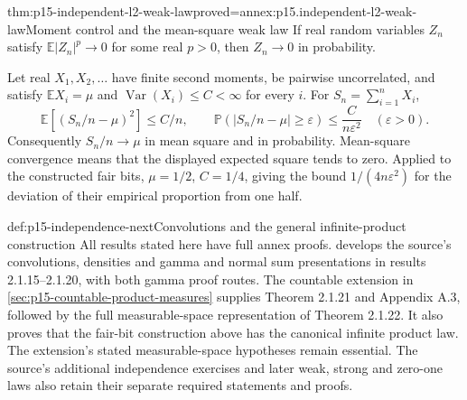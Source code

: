 \begin{hbtheorem}{thm:p15-independent-l2-weak-law}{proved=annex:p15.independent-l2-weak-law}{Moment control and the mean-square weak law}
If real random variables \(Z_n\) satisfy
\(\mathbb E|Z_n|^p\to0\) for some real \(p>0\), then
\(Z_n\to0\) in probability.

Let real \(X_1,X_2,\ldots\) have finite second moments, be
pairwise uncorrelated, and satisfy
\(\mathbb E X_i=\mu\) and \(\operatorname{Var}(X_i)\leq C<\infty\)
for every \(i\). For \(S_n=\sum_{i=1}^nX_i\),
\[
 \mathbb E\left[\left(S_n/n-\mu\right)^2\right]\leq C/n,
 \qquad
 \mathbb P(|S_n/n-\mu|\geq\varepsilon)
                     \leq\frac{C}{n\varepsilon^2}\quad(\varepsilon>0).
\]
Consequently \(S_n/n\to\mu\) in mean square and in probability.
Mean-square convergence means that the displayed expected square tends
to zero. Applied to the constructed fair bits, \(\mu=1/2\),
\(C=1/4\), giving the bound \(1/(4n\varepsilon^2)\) for the
deviation of their empirical proportion from one half.
\end{hbtheorem}

\begin{proofboundary}{def:p15-independence-next}{Convolutions and the general infinite-product construction}
All results stated here have full annex proofs.
 develops the source's
convolutions, densities and gamma and normal sum presentations in
results 2.1.15--2.1.20, with both gamma proof routes.
The countable extension in \cref{sec:p15-countable-product-measures}
supplies Theorem 2.1.21 and Appendix A.3, followed by the full
measurable-space representation of Theorem 2.1.22. It also proves that
the fair-bit construction above has the canonical infinite product law.
The extension's stated measurable-space hypotheses remain essential.
The source's additional independence exercises and later weak, strong
and zero-one laws also retain their separate required statements and proofs.
\end{proofboundary}
